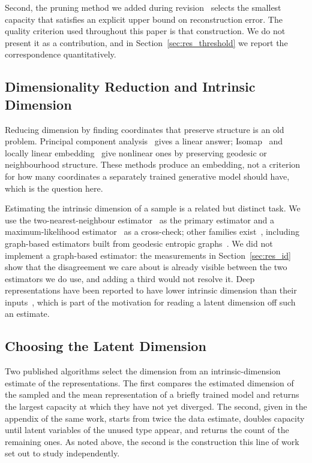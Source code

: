\documentclass[make,article,submit,pdftex,moreauthors]{Definitions/mdpi}
\begin{document}
Second, the pruning method we added during revision~\cite{deboom2020geco}
selects the smallest capacity that satisfies an explicit upper bound on reconstruction error.
The quality criterion used throughout this paper is that construction. We
do not present it as a contribution, and in Section~\ref{sec:res_threshold}
we report the correspondence quantitatively.

\subsection{Dimensionality Reduction and Intrinsic Dimension}\label{sec:rel_dr}

Reducing dimension by finding coordinates that preserve structure is an old
problem. Principal component analysis~\cite{tippingbishop1999ppca} gives a linear
answer; Isomap~\cite{tenenbaum2000isomap} and locally linear
embedding~\cite{roweis2000lle} give nonlinear ones by preserving geodesic or
neighbourhood structure. These methods produce an embedding, not a
criterion for how many coordinates a separately trained generative model
should have, which is the question here.

Estimating the intrinsic dimension of a sample is a related but distinct
task. We use the two-nearest-neighbour estimator~\cite{facco2017twonn} as the
primary estimator and a maximum-likelihood estimator~\cite{levina2005mle}
as a cross-check; other families
exist~\cite{ceruti2014danco,johnsson2015ess,camastra2016intrinsic,allegra2020data},
including graph-based estimators built from geodesic entropic
graphs~\cite{costa2004geodesic}. We did not
implement a graph-based estimator: the measurements in
Section~\ref{sec:res_id} show that the disagreement we care about is
already visible between the two estimators we do use, and adding a third
would not resolve it. Deep representations have been reported to have lower intrinsic dimension
than their inputs~\cite{ansuini2019intrinsic,pope2021intrinsic}, which is part of the
motivation for reading a latent dimension off such an estimate.

\subsection{Choosing the Latent Dimension}\label{sec:rel_select}

Two published algorithms select the dimension from an intrinsic-dimension
estimate of the representations. The first compares the estimated
dimension of the sampled and the mean representation of a briefly trained
model and returns the largest capacity at which they have not yet
diverged. The second, given in the appendix of the same work, starts from
twice the data estimate, doubles capacity until latent variables of the
unused type appear, and returns the count of the remaining ones. As noted
above, the second is the construction this line of work set out to study
independently.
\end{document}
